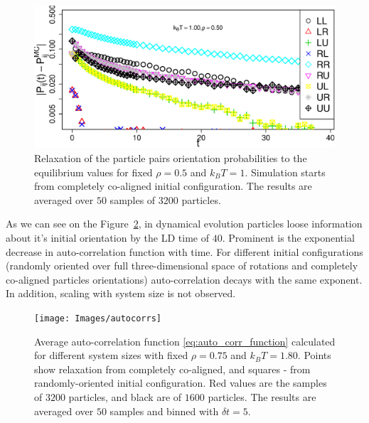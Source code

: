 \documentclass[12pt, a4paper]{article}
\newcommand{\figref}[1]{Figure~\ref{#1}}
\begin{document}
\begin{figure}
 \centering
  \includegraphics[width=\textwidth]{Images/particle_probs_dynamics}
 \captionsetup{justification=centering, width=0.9\columnwidth}
 \caption{Relaxation of the particle pairs orientation probabilities to the equilibrium values for fixed $\rho = 0.5$ and $k_BT = 1$. Simulation starts from completely co-aligned initial configuration. The results are averaged over $50$ samples of $3200$ particles.}
 \label{fig:dynamics_orientation_prob}
\end{figure}

As we can see on the \figref{fig:dynamics_auto_correlation_function}, in dynamical evolution particles loose information about it's initial orientation by the LD time of $40$. Prominent is the exponential decrease in auto-correlation function with time. For different initial configurations (randomly oriented over full three-dimensional space of rotations and completely co-aligned particles orientations) auto-correlation decays with the same exponent. In addition, scaling with system size is not observed.

\begin{figure}
 \centering
  \texttt{[image: Images/autocorrs]}
 \captionsetup{justification=centering, width=0.9\columnwidth}
 \caption{Average auto-correlation function \eqref{eq:auto_corr_function} calculated for different system sizes with fixed $\rho = 0.75$ and $k_BT = 1.80$. Points show relaxation from completely co-aligned, and squares - from randomly-oriented initial configuration. Red values are the samples of $3200$ particles, and black are of $1600$ particles. The results are averaged over $50$ samples and binned with $\delta t = 5$.}
 \label{fig:dynamics_auto_correlation_function}
\end{figure}
\end{document}
